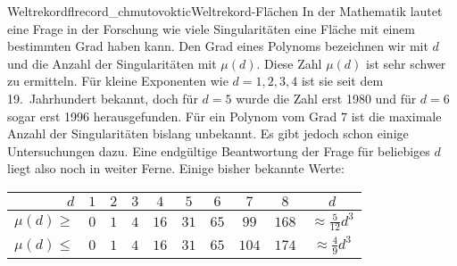 \begin{surferIntroPage}{Weltrekordfl}{record_chmutovoktic}{Weltrekord-Flächen}
    In der Mathematik lautet eine Frage in der Forschung wie viele Singularitäten eine Fläche mit einem bestimmten Grad haben kann. 
    Den Grad eines Polynoms bezeichnen wir mit $d$ und die Anzahl der Singularitäten mit $\mu(d)$. Diese Zahl $\mu(d)$ ist sehr schwer zu ermitteln. Für kleine Exponenten wie $d=1,2,3,4$ ist sie seit dem 19.\ Jahrhundert bekannt, doch für
    $d=5$ wurde die Zahl erst 1980 und für $d=6$ sogar erst 1996 herausgefunden.
    Für ein Polynom vom Grad $7$ ist die maximale Anzahl der Singularitäten bislang unbekannt. Es gibt jedoch schon einige Untersuchungen dazu.
    Eine endgültige Beantwortung der Frage für beliebiges $d$  liegt also noch in weiter Ferne.
    Einige bisher bekannte Werte:
    \begin{center}
      \begin{tabular}{r|cccccccc|c}
        $d$ & $1$ & $2$ & $3$ & $4$ & $5$ & $6$ & $7$ & $8$ & $d$\\
        \hline
        \hline
        \rule{0pt}{1.2em}$\mu(d)\ge$ & $0$ & $1$ & $4$ & $16$ & $31$ & $65$ &
        $99$ & $168$ & 
        $\approx \frac{5}{12}d^3$\\[0.3em]
        \hline
        \rule{0pt}{1.2em}$\mu(d)\le$ & $0$ & $1$ & $4$ & $16$ & $31$ & $65$ &
        $104$ & $174$ & $\approx \frac{4}{9}d^3$
      \end{tabular}
    \end{center}
\end{surferIntroPage}
